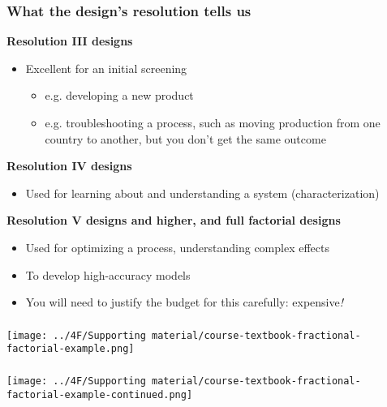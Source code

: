 \begin{frame}\frametitle{What the design's resolution tells us}

	\textbf{Resolution \textrm{III} designs}
	\begin{itemize}
		\item	Excellent for an initial screening
			\begin{itemize}
				\item	e.g. developing a new product 
				\item	e.g. troubleshooting a process, such as moving production from one country to another, but you don't get the same outcome
			\end{itemize}
	\end{itemize}

	\pause
	\vspace{0.5cm}
	\textbf{Resolution \textrm{IV} designs}
	\begin{itemize}
		\item	Used for learning about and understanding a system (characterization)
	\end{itemize}
	
	\pause
	\vspace{0.5cm}
	\textbf{Resolution \textrm{V} designs and higher, and full factorial designs}
	\begin{itemize}
		\item	Used for optimizing a process, understanding complex effects
		\item	To develop high-accuracy models
		\item	You will need to justify the budget for this carefully: expensive\emph{!}
	\end{itemize}
\end{frame}

\begin{frame}\frametitle{}
	\vspace{0.5cm}
	\centerline{\texttt{[image: ../4F/Supporting material/course-textbook-fractional-factorial-example.png]}}
		
\end{frame}

\begin{frame}\frametitle{}
	\vspace{0.5cm}
	\centerline{\texttt{[image: ../4F/Supporting material/course-textbook-fractional-factorial-example-continued.png]}}
		
\end{frame}

